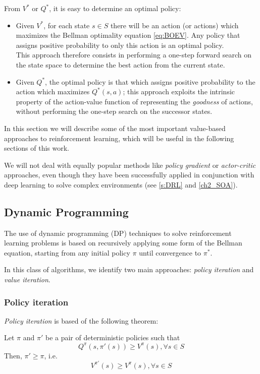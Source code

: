 From $V^*$ or $Q^*$, it is easy to determine an optimal policy:
\begin{itemize}
    \item Given $V^*$, for each state $s \in S$ there will be an action (or 
    actions) which maximizes the Bellman optimality equation \eqref{eq:BOEV}. 
    Any policy that assigns positive probability to only this action is an 
    optimal policy. \\
    This approach therefore consists in performing a one-step forward search on 
    the state space to determine the best action from the current state.
    \item Given $Q^*$, the optimal policy is that which assigns positive 
    probability to the action which maximizes $Q^*(s, a)$; this approach 
    exploits the intrinsic property of the action-value function of representing 
    the \textit{goodness} of actions, without performing the one-step search 
    on the successor states. 
\end{itemize}

In this section we will describe some of the most important value-based 
approaches to reinforcement learning, which will be useful in the following 
sections of this work. 

We will not deal with equally popular methods like \textit{policy gradient} or 
\textit{actor-critic} approaches, even though they have been successfully 
applied in conjunction with deep learning to solve complex environments (see 
\ref{s:DRL} and \ref{ch2_SOA}).

\subsection{Dynamic Programming}
The use of dynamic programming (DP) techniques to solve reinforcement learning 
problems is based on recursively applying some form of the Bellman equation, 
starting from any initial policy $\pi$ until convergence to $\pi^*$.

In this class of algorithms, we identify two main approaches: \textit{policy 
iteration} and \textit{value iteration}.

\subsubsection{Policy iteration}
\textit{Policy iteration} is based of the following theorem:
\begin{theorem} \label{th:pol_imp}
    Let $\pi$ and $\pi'$ be a pair of deterministic policies such that
    \[
        Q^\pi(s, \pi'(s)) \ge V^\pi(s), \forall s \in S 
    \]
    Then, $\pi' \ge \pi$, i.e. 
    \[
        V^{\pi'}(s) \ge V^{\pi}(s), \forall s \in S
    \]
\end{theorem}

